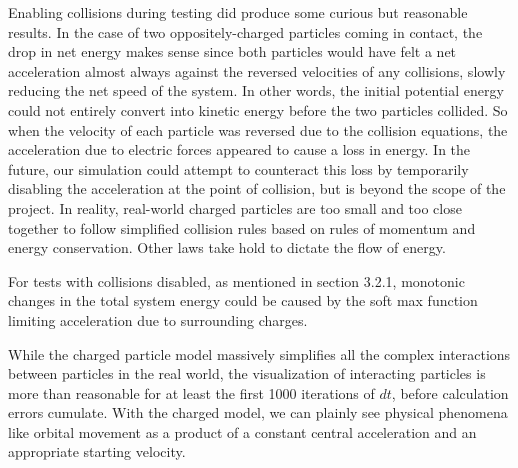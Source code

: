 \documentclass{article}
\begin{document}
Enabling collisions during testing did produce some curious but reasonable results.
In the case of two oppositely-charged particles coming in contact,
the drop in net energy makes sense since both particles
would have felt a net acceleration almost always against the reversed velocities of any collisions,
slowly reducing the net speed of the system.
In other words, the initial potential energy could not entirely convert into kinetic energy
before the two particles collided. So when the velocity of each particle was reversed due to the collision equations,
the acceleration due to electric forces appeared to cause a loss in energy.
In the future, our simulation could attempt to counteract this loss
by temporarily disabling the acceleration at the point of collision,
but is beyond the scope of the project.
In reality, real-world charged particles are too small and too close together
to follow simplified collision rules based on rules of momentum and energy conservation.
Other laws take hold to dictate the flow of energy.

For tests with collisions disabled, as mentioned in section 3.2.1,
monotonic changes in the total system energy could be caused
by the soft max function limiting acceleration due to surrounding charges.

While the charged particle model massively simplifies all the complex interactions between particles in the real world,
the visualization of interacting particles is more than reasonable for at least the first 1000 iterations of $dt$,
before calculation errors cumulate.
With the charged model, we can plainly see physical phenomena like orbital movement as a product of a constant central acceleration
and an appropriate starting velocity.
\end{document}
